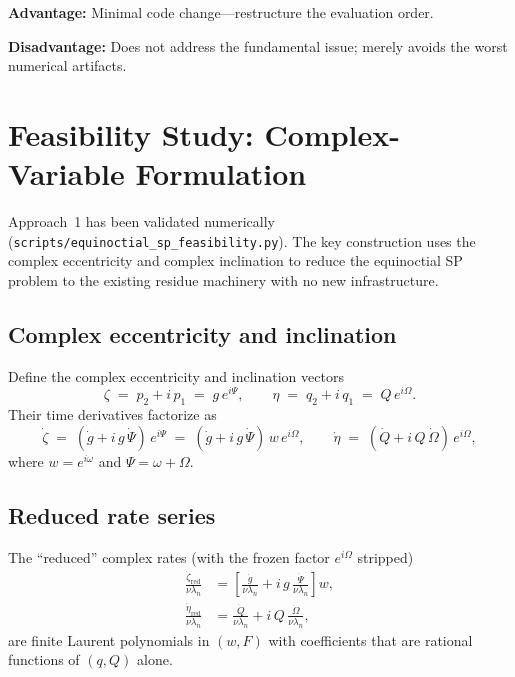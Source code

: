 \documentclass[11pt]{article}
\begin{document}
\textbf{Advantage:} Minimal code change---restructure the evaluation order.

\textbf{Disadvantage:} Does not address the fundamental issue; merely avoids
the worst numerical artifacts.

\section{Feasibility Study: Complex-Variable Formulation}
\label{sec:feasibility}

Approach~1 has been validated numerically
(\texttt{scripts/equinoctial\_sp\_feasibility.py}).
The key construction uses the complex eccentricity and complex inclination
to reduce the equinoctial SP problem to the existing residue machinery with
no new infrastructure.

\subsection{Complex eccentricity and inclination}

Define the complex eccentricity and inclination vectors
\[
\zeta \;=\; p_2 + i\,p_1 \;=\; g\,e^{i\Psi},
\qquad
\eta \;=\; q_2 + i\,q_1 \;=\; Q\,e^{i\Omega}.
\]
Their time derivatives factorize as
\[
\dot\zeta \;=\; (\dot g + i\,g\,\dot\Psi)\,e^{i\Psi}
         \;=\; (\dot g + i\,g\,\dot\Psi)\,w\,e^{i\Omega},
\qquad
\dot\eta \;=\; (\dot Q + i\,Q\,\dot\Omega)\,e^{i\Omega},
\]
where $w = e^{i\omega}$ and $\Psi = \omega + \Omega$.

\subsection{Reduced rate series}

The ``reduced'' complex rates (with the frozen factor $e^{i\Omega}$ stripped)
\begin{align}
\frac{\dot\zeta_{\mathrm{red}}}{\nu\lambda_n}
  &= \left[\frac{\dot g}{\nu\lambda_n}
     + i\,g\,\frac{\dot\Psi}{\nu\lambda_n}\right] w, \label{eq:zeta_red}\\[4pt]
\frac{\dot\eta_{\mathrm{red}}}{\nu\lambda_n}
  &= \frac{\dot Q}{\nu\lambda_n}
     + i\,Q\,\frac{\dot\Omega}{\nu\lambda_n}, \label{eq:eta_red}
\end{align}
are finite Laurent polynomials in $(w, F)$ with coefficients that are
rational functions of $(q, Q)$ alone.
\end{document}

